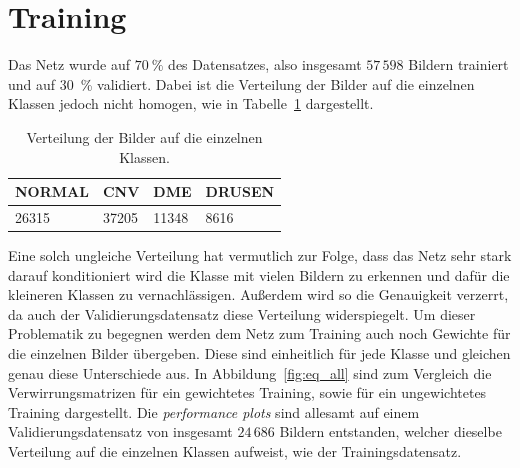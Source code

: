 \section{Training}
%
Das Netz wurde auf $\SI{70}{\percent}$ des Datensatzes, also insgesamt
$57\,598$ Bildern trainiert und auf \SI{30}{\percent} validiert. Dabei ist die
Verteilung der Bilder auf die einzelnen Klassen jedoch nicht homogen, wie in
Tabelle~\ref{tab:count} dargestellt.
%
\begin{table}[htb]
  \centering%
  \begin{tabular}{l
                  l
                  l
                  l}
      \toprule
      NORMAL    & CNV    & DME & DRUSEN \\
      \midrule
      26315     & 37205  & 11348 & 8616 \\
      \bottomrule
  \end{tabular}
  \caption{Verteilung der Bilder auf die einzelnen Klassen.}
  \label{tab:count}
\end{table}
%
Eine solch ungleiche Verteilung hat vermutlich zur Folge, dass das Netz sehr
stark darauf konditioniert wird die Klasse mit vielen Bildern zu erkennen und
dafür die kleineren Klassen zu vernachlässigen. Außerdem wird so die
Genauigkeit verzerrt, da auch der Validierungsdatensatz diese Verteilung
widerspiegelt. Um dieser Problematik zu begegnen werden dem Netz zum Training
auch noch Gewichte für die einzelnen Bilder übergeben. Diese sind einheitlich
für jede Klasse und gleichen genau diese Unterschiede aus.
In Abbildung~\ref{fig:eq_all} sind zum Vergleich die Verwirrungsmatrizen
für ein gewichtetes Training, sowie für ein ungewichtetes Training dargestellt.
Die \textit{performance plots} sind allesamt auf einem Validierungsdatensatz
von insgesamt $24\,686$ Bildern entstanden, welcher dieselbe Verteilung auf
die einzelnen Klassen aufweist, wie der Trainingsdatensatz.
%
